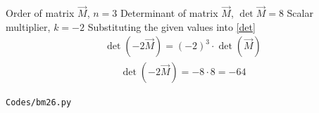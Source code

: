 \begin{enumerate}[label=\thesubsection.\arabic*, ref=\thesubsection.\theenumi]
   
Order of matrix $\vec{M}$, $n = 3$
Determinant of matrix $\vec{M}$, $\det\vec{M} = 8$
Scalar multiplier, $k = -2$
Substituting the given values into \eqref{det}
    \begin{align}
    \det(-2 \vec{M}) = (-2)^3 \cdot \det(\vec{M})
    \end{align}
    \begin{align}
    \det(-2 \vec{M}) = -8 \cdot 8 = -64
    \end{align}


\begin{lstlisting}
Codes/bm26.py
\end{lstlisting}


\end{enumerate}


%

